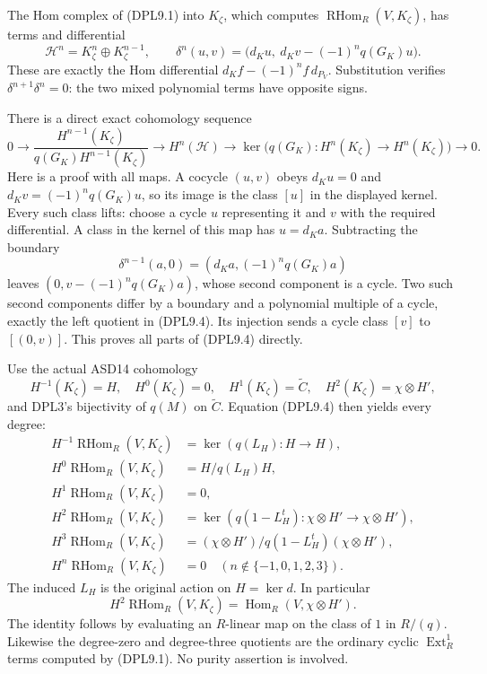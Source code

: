 The Hom complex of (DPL9.1) into \(K_\zeta\), which computes
\(\operatorname{RHom}_R(V,K_\zeta)\), has terms and differential \[
\mathscr H^n=K_\zeta^n\oplus K_\zeta^{n-1},\qquad
\delta^n(u,v)=\bigl(d_Ku,\ d_Kv-(-1)^nq(G_K)u\bigr).
\tag{DPL9.3}
\] These are exactly the Hom differential \(d_Kf-(-1)^nf\,d_{P_V}\).
Substitution verifies \(\delta^{n+1}\delta^n=0\): the two mixed
polynomial terms have opposite signs.

There is a direct exact cohomology sequence \[
0\longrightarrow
\frac{H^{n-1}(K_\zeta)}{q(G_K)H^{n-1}(K_\zeta)}
\longrightarrow H^n(\mathscr H)
\longrightarrow
\ker\bigl(q(G_K):H^n(K_\zeta)\to H^n(K_\zeta)\bigr)
\longrightarrow0.
\tag{DPL9.4}
\] Here is a proof with all maps. A cocycle \((u,v)\) obeys \(d_Ku=0\)
and \(d_Kv=(-1)^nq(G_K)u\), so its image is the class \([u]\) in the
displayed kernel. Every such class lifts: choose a cycle \(u\)
representing it and \(v\) with the required differential. A class in the
kernel of this map has \(u=d_Ka\). Subtracting the boundary \[
\delta^{n-1}(a,0)=(d_Ka,(-1)^nq(G_K)a)
\] leaves \((0,v-(-1)^nq(G_K)a)\), whose second component is a cycle.
Two such second components differ by a boundary and a polynomial
multiple of a cycle, exactly the left quotient in (DPL9.4). Its
injection sends a cycle class \([v]\) to \([(0,v)]\). This proves all
parts of (DPL9.4) directly.

Use the actual ASD14 cohomology \[
H^{-1}(K_\zeta)=H,\quad H^0(K_\zeta)=0,\quad
H^1(K_\zeta)=\widetilde C,\quad H^2(K_\zeta)=\chi\otimes H',
\] and DPL3's bijectivity of \(q(M)\) on \(\widetilde C\). Equation
(DPL9.4) then yields every degree: \[
\boxed{
\begin{aligned}
H^{-1}\operatorname{RHom}_R(V,K_\zeta)
&=\ker(q(L_H):H\to H),\\
H^{0}\operatorname{RHom}_R(V,K_\zeta)
&=H/q(L_H)H,\\
H^{1}\operatorname{RHom}_R(V,K_\zeta)
&=0,\\
H^{2}\operatorname{RHom}_R(V,K_\zeta)
&=\ker(q(1-L_H^t):\chi\otimes H'\to\chi\otimes H'),\\
H^{3}\operatorname{RHom}_R(V,K_\zeta)
&=(\chi\otimes H')/q(1-L_H^t)(\chi\otimes H'),\\
H^{n}\operatorname{RHom}_R(V,K_\zeta)&=0
\quad(n\notin\{-1,0,1,2,3\}).
\end{aligned}}
\tag{DPL9.5}
\] The induced \(L_H\) is the original action on \(H=\ker d\). In
particular \[
H^2\operatorname{RHom}_R(V,K_\zeta)
=\operatorname{Hom}_R(V,\chi\otimes H').
\tag{DPL9.6}
\] The identity follows by evaluating an \(R\)-linear map on the class
of \(1\) in \(R/(q)\). Likewise the degree-zero and degree-three
quotients are the ordinary cyclic \(\operatorname{Ext}^1_R\) terms
computed by (DPL9.1). No purity assertion is involved.

